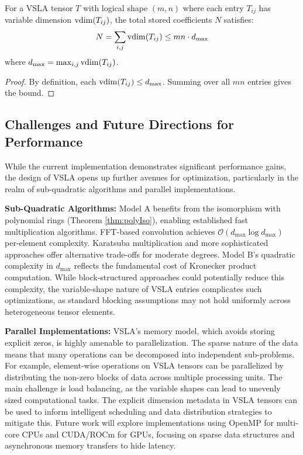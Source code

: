 \begin{lemma}
\label{lem:memory-bound}
For a VSLA tensor $T$ with logical shape $(m, n)$ where each entry $T_{ij}$ has variable dimension $\operatorname{vdim}(T_{ij})$, the total stored coefficients $N$ satisfies:
\[
N = \sum_{i,j} \operatorname{vdim}(T_{ij}) \leq mn \cdot d_{\max}
\]
where $d_{\max} = \max_{i,j} \operatorname{vdim}(T_{ij})$.
\end{lemma}
\begin{proof}
By definition, each $\operatorname{vdim}(T_{ij}) \leq d_{\max}$. Summing over all $mn$ entries gives the bound.
\end{proof}

\subsection{Challenges and Future Directions for Performance}
While the current implementation demonstrates significant performance gains, the design of VSLA opens up further avenues for optimization, particularly in the realm of sub-quadratic algorithms and parallel implementations.

\textbf{Sub-Quadratic Algorithms:} Model A benefits from the isomorphism with polynomial rings (Theorem \ref{thm:polyIso}), enabling established fast multiplication algorithms. FFT-based convolution \cite{CooleyTukey1965} achieves $\mathcal{O}(d_{\max}\log d_{\max})$ per-element complexity. Karatsuba multiplication \cite{Karatsuba1962} and more sophisticated approaches \cite{CantorKaltofen1991} offer alternative trade-offs for moderate degrees. Model B's quadratic complexity in $d_{\max}$ reflects the fundamental cost of Kronecker product computation. While block-structured approaches could potentially reduce this complexity, the variable-shape nature of VSLA entries complicates such optimizations, as standard blocking assumptions may not hold uniformly across heterogeneous tensor elements.

\textbf{Parallel Implementations:} VSLA's memory model, which avoids storing explicit zeros, is highly amenable to parallelization. The sparse nature of the data means that many operations can be decomposed into independent sub-problems. For example, element-wise operations on VSLA tensors can be parallelized by distributing the non-zero blocks of data across multiple processing units. The main challenge is load balancing, as the variable shapes can lead to unevenly sized computational tasks. The explicit dimension metadata in VSLA tensors can be used to inform intelligent scheduling and data distribution strategies to mitigate this. Future work will explore implementations using OpenMP for multi-core CPUs and CUDA/ROCm for GPUs, focusing on sparse data structures and asynchronous memory transfers to hide latency.
